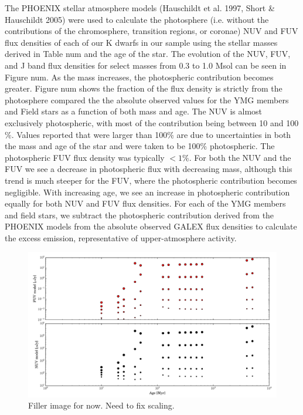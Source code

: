 \documentclass[twocolumn]{aastex62}
\begin{document}
The PHOENIX stellar atmosphere models (Hauschildt et al. 1997, Short & Hauschildt 2005) were used to calculate the photosphere (i.e. without the contributions of the chromosphere, transition regions, or coronae) NUV and FUV flux densities of each of our K dwarfs in our sample using the stellar masses derived in Table num and the age of the star. The evolution of the NUV, FUV, and J band flux densities for select masses from 0.3 to 1.0 Msol can be seen in Figure num.  As the mass increases, the photospheric contribution becomes greater. 
Figure num shows the fraction of the flux density is strictly from the photosphere compared the the absolute observed values for the YMG members and Field stars as a function of both mass and age. The NUV is almost exclusively photospheric, with most of the contribution being between 10 and 100$\%$. Values reported that were larger than 100$\%$ are due to uncertainties in both the mass and age of the star and were taken to be 100$\%$ photospheric. The photospheric FUV flux density was typically $<1\%$. For both the NUV and the FUV we see a decrease in photospheric flux with decreasing mass, although this trend is much steeper for the FUV, where the photospheric contribution becomes negligible. With increasing age, we see an increase in photospheric contribution equally for both NUV and FUV flux densities. 
For each of the YMG members and field stars, we subtract the photospheric contribution derived from the PHOENIX models from the absolute observed GALEX flux densities to calculate the excess emission, representative of upper-atmosphere activity. 





\begin{figure}[bh]
\includegraphics[width=\linewidth]{mfd_vs_age.pdf}
\caption{Filler image for now. Need to fix scaling. \label{fig:mvd_vs_age}}
\end{figure}
\end{document}
